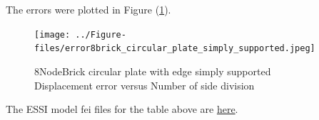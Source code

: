 \documentclass[fleqn,11pt]{article}
\begin{document}

The errors were plotted in Figure (\ref{fig 8NodeBrick circular plate with four edge simply supported}).

\begin{figure}[H]
    \centering
    \texttt{[image: ../Figure-files/error8brick\_circular\_plate\_simply\_supported.jpeg]}
  \captionsetup{justification=centering,margin=3cm}
  \caption{8NodeBrick circular plate with edge simply supported\\
      Displacement error   versus   Number of side division}
  \label{fig 8NodeBrick circular plate with four edge simply supported}
\end{figure}


The ESSI model fei files for the table above are \href{https://github.com/yuan-energy/ESSI_Verification/blob/master/8NodeBrick/circular_plate_simply_support/circular_plate_simply_support.tar.gz?raw=true}{here}.
\end{document}
